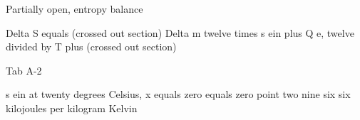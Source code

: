 Partially open, entropy balance

Delta S equals (crossed out section) Delta m twelve times s ein plus Q e, twelve divided by T plus (crossed out section)

Tab A-2

s ein at twenty degrees Celsius, x equals zero equals zero point two nine six six kilojoules per kilogram Kelvin